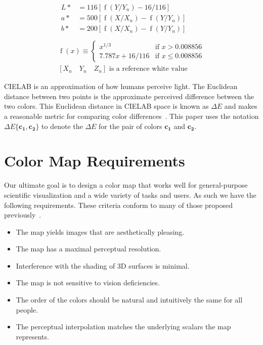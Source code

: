 \documentclass[review,journal]{vgtc}         %
\newcommand{\lcite}[1]{~\cite{#1}}
\newcommand{\Lab}{CIELAB\xspace}
\newcommand{\DeltaE}{\ensuremath{\Delta{}E}\xspace}
\newcommand*{\cvec}[1]{\mathbf{#1}}
\begin{document}
\begin{equation}
  \begin{gathered}
    \begin{aligned}
      L* &= 116 \left[ \operatorname{f}(Y/Y_n) - 16/116 \right] \\
      a* &=
        500 \left[ \operatorname{f}(X/X_n) - \operatorname{f}(Y/Y_n) \right] \\
      b* &=
        200 \left[ \operatorname{f}(X/X_n) - \operatorname{f}(Y/Y_n) \right] \\
    \end{aligned} \\
    \operatorname{f}(x) \equiv
    \begin{cases}
      x^{1/3}          & \text{if $x > 0.008856$} \\
      7.787 x + 16/116 & \text{if $x \leq 0.008856$}
    \end{cases} \\
    [X_n \quad Y_n \quad Z_n] \text{ is a reference white value}
  \end{gathered}
  \label{eqn:xyz2lab}
\end{equation}

\Lab is an approximation of how humans perceive light.  The Euclidean
distance between two points is the approximate perceived difference between
the two colors.  This Euclidean distance in \Lab space is known as \DeltaE
and makes a reasonable metric for comparing color differences\lcite{Wyszecki82}.
This paper uses the notation $\DeltaE\{\cvec{c_1},\cvec{c_2}\}$ to denote
the \DeltaE for the pair of colors $\cvec{c_1}$ and $\cvec{c_2}$.


\section{Color Map Requirements}
\label{sec:ColorMapRequirements}

Our ultimate goal is to design a color map that works well for
general-purpose scientific visualization and a wide
variety of tasks and users.  As such we have the following requirements.
These criteria conform to many of those proposed
previously\lcite{Fortner97,Levkowitz92,Light04}.

\begin{itemize}
\item The map yields images that are aesthetically pleasing.
\item The map has a maximal perceptual resolution.
\item Interference with the shading of 3D surfaces is minimal.
\item The map is not sensitive to vision deficiencies.
\item The order of the colors should be natural and intuitively the same
  for all people.
\item The perceptual interpolation matches the underlying scalars the map
  represents.
\end{itemize}
\end{document}
